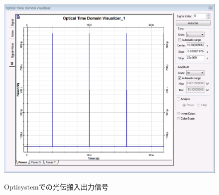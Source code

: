 \begin{figure}[t!]
\begin{center}
{\includegraphics[keepaspectratio,scale=0.23]{fig/4/test_in3.png}
\label{fig:test_in3}}
\caption{Optisystemでの光伝搬入出力信号}
\label{fig:test}
\end{center}
\end{figure}

